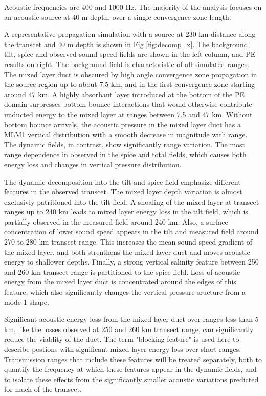 \documentclass[preprint,NumberedRefs]{JASA}
\begin{document}
Acoustic frequencies are 400 and 1000 Hz. The majority of the analysis focuses on an acoustic source at 40 m depth, over a single convergence zone length.

A representative propagation simulation with a source at 230 km distance along the transcet and 40 m depth is shown in Fig \ref{fig:decomp_x}. The background, tilt, spice and observed sound speed fields are shown in the left column, and PE results on right. The background field is charactoristic of all simulated ranges. The mixed layer duct is obscured by high angle convergence zone propagation in the source region up to about 7.5 km, and in the first convergence zone starting around 47 km. A highly absorbant layer introduced at the bottom of the PE domain surpresses bottom bounce interactions that would otherwise contribute unducted energy to the mixed layer at ranges between 7.5 and 47 km. Without bottom bounce arrivals, the acoustic pressure in the mixed layer duct has a MLM1 vertical distribution with a smooth decrease in magnitude with range. The dynamic fields, in contrast, show significantly range variation. The most range dependence in observed in the spice and total fields, which causes both energy loss and changes in vertical pressure distribution.

The dynamic decomposition into the tilt and spice field emphasize different features in the observed transcet. The mixed layer depth variation is almost exclusivly patritioned into the tilt field. A shoaling of the mixed layer at transcet ranges up to 240 km leads to mixed layer energy loss in the tilt field, which is partially observed in the measured field around 240 km. Also, a surface concentration of lower sound speed appears in the tilt and measured field around 270 to 280 km transcet range. This increases the mean sound speed gradient of the mixed layer, and both strenthens the mixed layer duct and moves acoustic energy to shallower depths. Finally, a strong vertical salinity feature between 250 and 260 km transcet range is partitioned to the spice field. Loss of acoustic energy from the mixed layer duct is concentrated around the edges of this feature, which also significantly changes the vertical pressure sructure from a mode 1 shape.

Significant acoustic energy loss from the mixed layer duct over ranges less than 5 km, like the losses observed at 250 and 260 km transect range, can significantly reduce the viablity of the duct. The term "blocking feature" is used here to describe postions with significant mixed layer energy loss over short ranges. Transmission ranges that include these features will be treated separately, both to quantify the frequency at which these features appear in the dynamic fields, and to isolate these effects from the significantly smaller acoustic variations predicted for much of the transcet.
\end{document}
